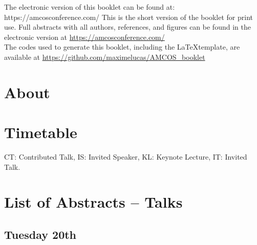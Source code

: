 \documentclass[openany, parskip=full, 12pt, a4]{scrbook}
\begin{document}
	
	
	
\mbox{}
\thispagestyle{empty}
\vfill
\begin{center}
	\ifOnline
	The electronic version of this booklet can be found at: \\
	https://amcosconference.com/
	\else
	This is the short version of the booklet for print use. Full abstracts with all authors, references, and figures can be found in the electronic version at \url{https://amcosconference.com/}
	\fi %
	\\[20pt]
	The codes used to generate this booklet, including the \LaTeX\space template, are available at \url{https://github.com/maximelucas/AMCOS\_booklet}
\end{center}

\newpage

\tableofcontents

\chapter{About}



\chapter{Timetable}

CT: Contributed Talk, IS: Invited Speaker, KL: Keynote Lecture, IT: Invited Talk.


\chapter{List of Abstracts -- Talks}

\section{Tuesday 20th}







\end{document}
